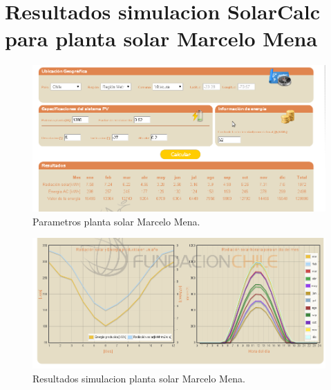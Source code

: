 \section{Resultados simulacion SolarCalc para planta solar Marcelo Mena}
\label{mmena}

\begin{figure}[h!]
        \centering
        \includegraphics[scale=0.4]{images/simMmena1}
        \caption{Parametros planta solar Marcelo Mena.}
        \label{fotoEstacionFch}
\end{figure}
\begin{figure}[h!]
        \centering
        \includegraphics[scale=0.4]{images/simMmena2}
	\caption{Resultados simulacion planta solar Marcelo Mena.}
        \label{fotoEstacionFch}
\end{figure}
